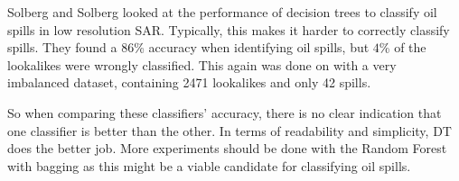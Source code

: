 Solberg and Solberg \cite{Delfrate2004} looked at the performance of decision trees to classify oil spills in low resolution SAR. Typically, this makes it harder to correctly classify spills. They found a $86$\% accuracy when identifying oil spills, but $4$\% of the lookalikes were wrongly classified. This again was done on with a very imbalanced dataset, containing 2471 lookalikes and only 42 spills.

So when comparing these classifiers' accuracy, there is no clear indication that one classifier is better than the other. In terms of readability and simplicity, DT does the better job. More experiments should be done with the Random Forest with bagging as this might be a viable candidate for classifying oil spills.